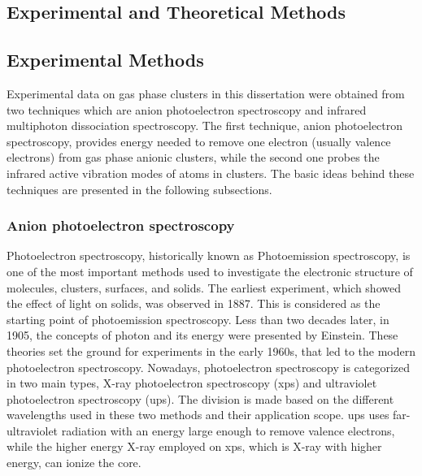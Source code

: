
\begin{refsection}
	
\chapter{Experimental and Theoretical Methods} \label{methods}


\section{Experimental Methods}

Experimental data on gas phase clusters in this dissertation were obtained from two techniques which are anion photoelectron spectroscopy and infrared multiphoton dissociation spectroscopy. The first technique, anion photoelectron spectroscopy, provides energy needed to remove one electron (usually valence electrons) from gas phase anionic clusters, while the second one probes the infrared active vibration modes of atoms in clusters. The basic ideas behind these techniques are presented in the following subsections.   




\subsection{Anion photoelectron spectroscopy}

Photoelectron spectroscopy, historically known as Photoemission spectroscopy, is one of the most important methods used to investigate the electronic structure of molecules, clusters, surfaces, and solids.\cite{c1:reinert2005} The earliest experiment, which showed the effect of light on solids, was observed in 1887.\cite{c1:reinert2005} This is considered as the starting point of photoemission spectroscopy. Less than two decades later, in 1905, the concepts of photon and its energy were presented by Einstein. These theories set the ground for experiments in the early 1960s, that led to the modern photoelectron spectroscopy.\cite{c1:Spicer1964, c1:berglund1964, c1:Turner1962} Nowadays, photoelectron spectroscopy is categorized in two main types, X-ray photoelectron spectroscopy (\acrshort{xps}) and ultraviolet photoelectron spectroscopy (\acrshort{ups}). The division is made based on the different wavelengths used in these two methods and their application scope. \acrshort{ups} uses far-ultraviolet radiation with an energy large enough to remove valence electrons, while the higher energy X-ray employed on \acrshort{xps}, which is X-ray with higher energy, can ionize the core. %




\end{refsection}
